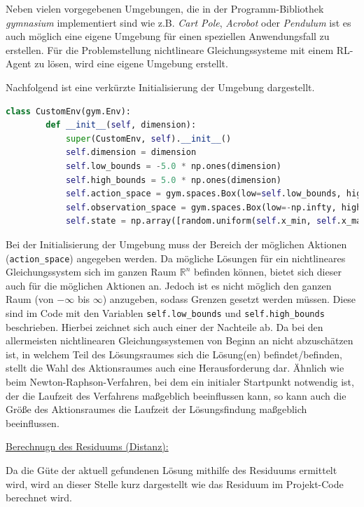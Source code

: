 \documentclass{article}
\def\code#1{\texttt{#1}}
\theoremstyle{newline}
\begin{document}
\begin{onehalfspace}
Neben vielen vorgegebenen Umgebungen, die in der Programm-Bibliothek \textit{gymnasium} implementiert sind wie z.B. \textit{Cart Pole}, \textit{Acrobot} oder \textit{Pendulum} ist es auch möglich eine eigene Umgebung für einen speziellen Anwendungsfall zu erstellen. Für die Problemstellung nichtlineare Gleichungssysteme mit einem RL-Agent zu lösen, wird eine eigene Umgebung erstellt. 

Nachfolgend ist eine verkürzte Initialisierung der Umgebung dargestellt.

\begin{lstlisting}[language=Python, caption={Initialisierung der Umgebung}, label={lst:python}]
	class CustomEnv(gym.Env):
		def __init__(self, dimension):
			super(CustomEnv, self).__init__()
			self.dimension = dimension
			self.low_bounds = -5.0 * np.ones(dimension)
			self.high_bounds = 5.0 * np.ones(dimension)
			self.action_space = gym.spaces.Box(low=self.low_bounds, high=self.high_bounds, dtype=np.float64)
			self.observation_space = gym.spaces.Box(low=-np.infty, high=np.infty, shape=(dimension,))
			self.state = np.array([random.uniform(self.x_min, self.x_max), random.uniform(self.y_min, self.y_max)] + [0.0] * dimension)	
\end{lstlisting}

Bei der Initialisierung der Umgebung muss der Bereich der möglichen Aktionen (\code{action\_space}) angegeben werden. Da mögliche Lösungen für ein nichtlineares Gleichungssystem sich im ganzen Raum $\mathbb{R}^n$ befinden können, bietet sich dieser auch für die möglichen Aktionen an. Jedoch ist es nicht möglich den ganzen Raum (von $-\infty$ bis $\infty$) anzugeben, sodass Grenzen gesetzt werden müssen. Diese sind im Code mit den Variablen \code{self.low\_bounds} und \code{self.high\_bounds} beschrieben. Hierbei zeichnet sich auch einer der Nachteile ab. Da bei den allermeisten nichtlinearen Gleichungssystemen von Beginn an nicht abzuschätzen ist, in welchem Teil des Lösungsraumes sich die Lösung(en) befindet/befinden, stellt die Wahl des Aktionsraumes auch eine Herausforderung dar. Ähnlich wie beim Newton-Raphson-Verfahren, bei dem ein initialer Startpunkt notwendig ist, der die Laufzeit des Verfahrens maßgeblich beeinflussen kann, so kann auch die Größe des Aktionsraumes die Laufzeit der Lösungsfindung maßgeblich beeinflussen.
\bigskip

\underline{Berechnugn des Residuums (Distanz):}
\smallskip

Da die Güte der aktuell gefundenen Lösung mithilfe des Residuums ermittelt wird, wird an dieser Stelle kurz dargestellt wie das Residuum im Projekt-Code berechnet wird.
\medskip


\end{onehalfspace}
\end{document}

